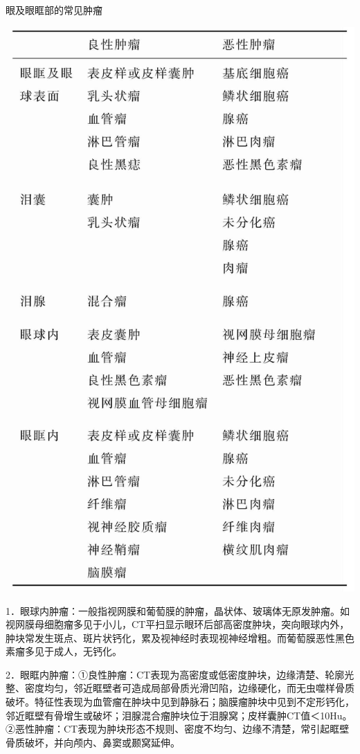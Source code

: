 \begin{table}[htbp]
\centering
\caption{眼及眼眶部的常见肿瘤}
\label{tab3-2}
\includegraphics[width=\textwidth,height=\textheight,keepaspectratio]{./images/Image00101.jpg}
\end{table}

1．眼球内肿瘤：一般指视网膜和葡萄膜的肿瘤，晶状体、玻璃体无原发肿瘤。如视网膜母细胞瘤多见于小儿，CT平扫显示眼环后部高密度肿块，突向眼球内外，肿块常发生斑点、斑片状钙化，累及视神经时表现视神经增粗。而葡萄膜恶性黑色素瘤多见于成人，无钙化。

2．眼眶内肿瘤：①良性肿瘤：CT表现为高密度或低密度肿块，边缘清楚、轮廓光整、密度均匀，邻近眶壁者可造成局部骨质光滑凹陷，边缘硬化，而无虫噬样骨质破坏。特征性表现为血管瘤在肿块中见到静脉石；脑膜瘤肿块中见到不定形钙化，邻近眶壁有骨增生或破坏；泪腺混合瘤肿块位于泪腺窝；皮样囊肿CT值＜10Hu。②恶性肿瘤：CT表现为肿块形态不规则、密度不均匀、边缘不清楚，常引起眶壁骨质破坏，并向颅内、鼻窦或颞窝延伸。


